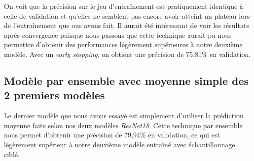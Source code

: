On voit que la précision sur le jeu d'entraînement est pratiquement identique à celle de validation et qu'elles ne semblent pas encore avoir atteint un plateau lors de l'entraînement que ous avons fait. Il aurait été intéressant de voir les résultats après convergence puisque nous passons que cette technique aurait pu nous permettre d'obtenir des performances légèrement supérieures à notre deuxième modèle. 
Avec un \emph{early stopping}, on obtient une précision de 75.81\% en validation. 


\subsection{Modèle par ensemble avec moyenne simple des 2 premiers modèles}

Le dernier modèle que nous avons essayé est simplement d'utiliser la prédiction moyenne faite selon nos deux modèles \emph{ResNet18}. 
Cette technique par ensemble nous permet d'obtenir une précision de 79,94\% en validation, ce qui est légèrement supérieur à notre deuxième modèle entraîné avec échantillonnage ciblé. 

